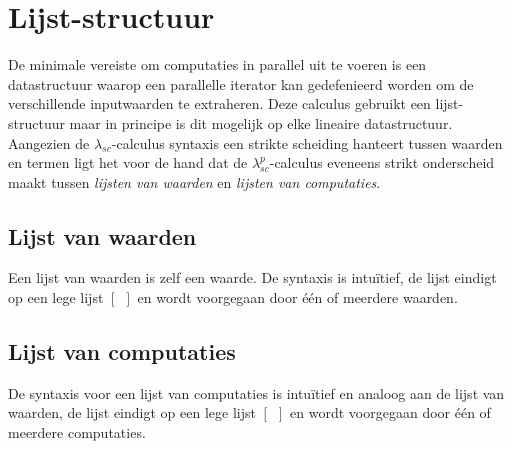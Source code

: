 \section{Lijst-structuur}
De minimale vereiste om computaties in parallel uit te voeren is een datastructuur waarop een parallelle iterator kan gedefenieerd worden om de verschillende inputwaarden te extraheren.
Deze calculus gebruikt een lijst-structuur maar in principe is dit mogelijk op elke lineaire datastructuur. \newline
Aangezien de $\lambda_{sc}$-calculus syntaxis een strikte scheiding hanteert tussen waarden en termen ligt het voor de hand dat de $\lambda_{sc}^{p}$-calculus eveneens strikt onderscheid maakt tussen \emph{lijsten van waarden} en \emph{lijsten van computaties}.

\subsection{Lijst van waarden}
Een lijst van waarden is zelf een waarde. De syntaxis is intuïtief, de lijst eindigt op een lege lijst $[\:\:]$ en wordt voorgegaan door één of meerdere waarden.

\subsection{Lijst van computaties}
De syntaxis voor een lijst van computaties is intuïtief en analoog aan de lijst van waarden, de lijst eindigt op een lege lijst $[\:\:]$ en wordt voorgegaan door één of meerdere computaties.

